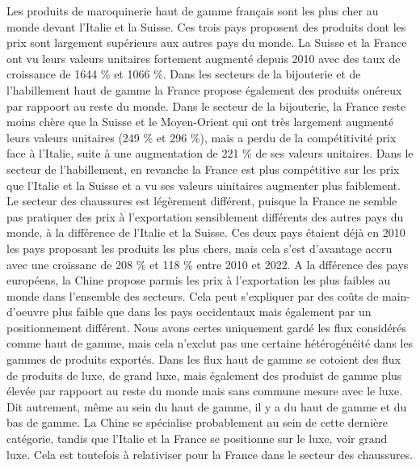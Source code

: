 \documentclass[french,10pt,a4paper]{article}
\begin{document}
Les produits de maroquinerie haut de gamme français sont les plus cher au monde devant l'Italie et la Suisse. Ces trois pays proposent des produits dont les prix sont largement supérieurs aux autres pays du monde. La Suisse et la France ont vu leurs valeurs unitaires fortement augmenté depuis 2010 avec des taux de croissance de 1644 \% et 1066 \%. Dans les secteurs de la bijouterie et de l'habillement haut de gamme la France propose également des produits onéreux par rappoort au reste du monde. Dans le secteur de la bijouterie, la France reste moins chère que la Suisse et le Moyen-Orient qui ont très largement augmenté leurs valeurs unitaires (249 \% et 296 \%), mais a perdu de la compétitivité prix face à l'Italie, suite à une augmentation de 221 \% de ses valeurs unitaires. Dans le secteur de l'habillement, en revanche la France est plus compétitive sur les prix que l'Italie et la Suisse et a vu ses valeurs uinitaires augmenter plus faiblement. Le secteur des chaussures est légèrement différent, puisque la France ne semble pas pratiquer des prix à l'exportation sensiblement différents des autres pays du monde, à la différence de l'Italie et la Suisse. Ces deux pays étaient déjà en 2010 les pays proposant les produits les plus chers, mais cela s'est d'avantage accru avec une croissanc de 208 \% et 118 \% entre 2010 et 2022. A la dfférence des pays européens, la Chine propose parmis les prix à l'exportation les plus faibles au monde dans l'ensemble des secteurs. Cela peut s'expliquer par des coûts de main-d'oeuvre plus faible que dans les pays occidentaux mais également par un positionnement différent. Nous avons certes uniquement gardé les flux considérés comme haut de gamme, mais cela n'exclut pas une certaine hétérogénéité dans les gammes de produits exportés. Dans les flux haut de gamme se cotoient des flux de produits de luxe, de grand luxe, mais également des produist de gamme plus élevée par rappoort au reste du monde mais sans commune mesure avec le luxe. Dit autrement, même au sein du haut de gamme, il y a du haut de gamme et du bas de gamme. La Chine se spécialise probablement au sein de cette dernière catégorie, tandis que l'Italie et la France se positionne sur le luxe, voir grand luxe. Cela est toutefois à relativiser pour la France dans le secteur des chaussures. 
\end{document}
